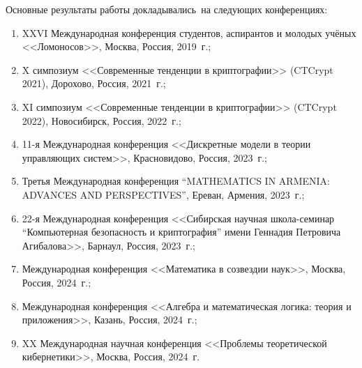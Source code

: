 {\probation}
Основные результаты работы докладывались~на следующих конференциях:
\begin{enumerate}
    \item XXVI Международная конференция студентов, аспирантов и молодых учёных <<Ломоносов>>, Москва, Россия, 2019~г.;

    \item X симпозиум <<Современные тенденции в криптографии>> (CTCrypt 2021), Дорохово, Россия, 2021~г.;

    \item XI симпозиум <<Современные тенденции в криптографии>> (CTCrypt 2022), Новосибирск, Россия, 2022~г.;


    \item 11-я Международная конференция <<Дискретные модели в теории управляющих систем>>, Красновидово, Россия, 2023~г.;

    \item Третья Международная конференция ``MATHEMATICS IN ARMENIA: ADVANCES AND PERSPECTIVES'', Ереван, Армения, 2023~г.;

    \item 22-я Международная конференция <<Сибирская научная школа-семинар ``Компьютерная безопасность и криптография'' имени Геннадия Петровича Агибалова>>, Барнаул, Россия, 2023~г.;

    \item Международная конференция <<Математика в созвездии наук>>, Москва, Россия, 2024~г.;

    \item Международная конференция <<Алгебра и математическая логика: теория и приложения>>, Казань, Россия, 2024~г.;

    \item XX Международная научная конференция <<Проблемы теоретической кибернетики>>, Москва, Россия, 2024~г.
\end{enumerate}

